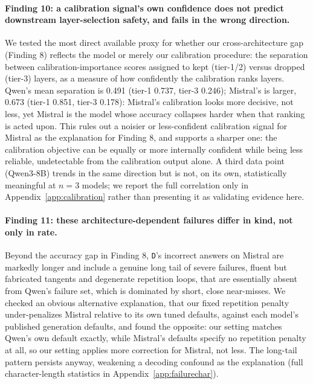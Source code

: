 \documentclass[11pt]{article}
\begin{document}
\paragraph{Finding 10: a calibration signal's own confidence does not
predict downstream layer-selection safety, and fails in the wrong
direction.} We tested the most direct available proxy for whether our
cross-architecture gap (Finding 8) reflects the model or merely our
calibration procedure: the separation between calibration-importance
scores assigned to kept (tier-1/2) versus dropped (tier-3) layers, as a
measure of how confidently the calibration ranks layers. Qwen's mean
separation is 0.491 (tier-1 0.737, tier-3 0.246); Mistral's is larger,
0.673 (tier-1 0.851, tier-3 0.178): Mistral's calibration looks more
decisive, not less, yet Mistral is the model whose accuracy collapses
harder when that ranking is acted upon. This rules out a noisier or
less-confident calibration signal for Mistral as the explanation for
Finding 8, and supports a sharper one: the calibration objective can be
equally or more internally confident while being less reliable,
undetectable from the calibration output alone. A third data point
(Qwen3-8B) trends in the same direction but is not, on its own,
statistically meaningful at $n=3$ models; we report the full correlation
only in Appendix~\ref{app:calibration} rather than presenting it as
validating evidence here.

\paragraph{Finding 11: these architecture-dependent failures differ in
kind, not only in rate.} Beyond the accuracy gap in Finding 8,
\texttt{D}'s incorrect answers on Mistral are markedly longer and include
a genuine long tail of severe failures, fluent but fabricated tangents and
degenerate repetition loops, that are essentially absent from Qwen's
failure set, which is dominated by short, close near-misses. We checked
an obvious alternative explanation, that our fixed repetition penalty
under-penalizes Mistral relative to its own tuned defaults, against each
model's published generation defaults, and found the opposite: our
setting matches Qwen's own default exactly, while Mistral's defaults
specify no repetition penalty at all, so our setting applies more
correction for Mistral, not less. The long-tail pattern persists anyway,
weakening a decoding confound as the explanation (full character-length
statistics in Appendix~\ref{app:failurechar}).
\end{document}
